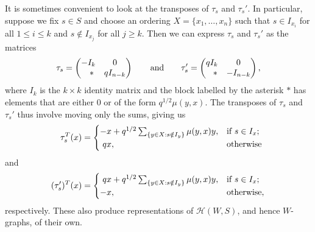 \noindent It is sometimes convenient to look at the transposes of $\tau_s$ and $\tau_s'$. In particular, suppose we fix $s \in S$ and choose an ordering $X = \{x_1, \dots, x_n\}$ such that $s \in I_{x_i}$ for all $1 \leq i \leq k$ and $s \notin I_{x_j}$ for all $j \geq k$. Then we can express $\tau_s$ and $\tau_s'$ as the matrices
\begin{align*}
\begin{split}
\tau_s = \begin{pmatrix}-I_k & 0\\ \hphantom{-}* & qI_{n-k}\end{pmatrix}\qquad\text{and}\qquad\tau_s' = \begin{pmatrix}qI_k & 0\\ \hphantom{-}* & -I_{n-k}\end{pmatrix},
\end{split}
\end{align*}
\noindent where $I_k$ is the $k\times k$ identity matrix and the block labelled by the asterisk $*$ has elements that are either $0$ or of the form $q^{1/2}\mu(y, x)$. The transposes of $\tau_s$ and $\tau_s'$ thus involve moving only the sums, giving us
\begin{align*}
\begin{split}
\nhphantom{$\tau_s^T$}\hphantom{(\tau_s')^T}\tau_s^T(x) = \begin{cases}
-x + q^{1/2}\sum_{\{y \in X : s \notin I_y\}} \mu(y, x)y, &\text{if $s \in I_x$;}\\
\nhphantom{$q$}\hphantom{-}qx, &\text{otherwise\hphantom{,}}
\end{cases}
\end{split}
\end{align*}
\noindent and
\begin{align*}
\begin{split}
(\tau_s')^T(x) = \begin{cases}
\nhphantom{$q$}\hphantom{-}qx + q^{1/2}\sum_{\{y \in X : s \notin I_y\}} \mu(y, x)y, &\text{if $s \in I_x$;}\\
-x, &\text{otherwise,}
\end{cases}
\end{split}
\end{align*}
\noindent respectively. These also produce representations of $\mathscr{H}(W, S)$, and hence $W$-graphs, of their own.\\

